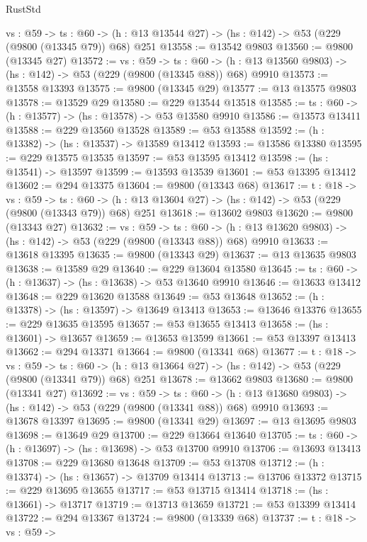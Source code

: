 \begin{lexlean}{RustStd}
\begin{coremodule}
  {vs : @59} ->
  {ts : @60} -> (h : @13 @13544 @27) -> (hs : @142) -> @53 (@229 (@9800 (@13345 @79)) @68) @251
@13558 := @13542 @9803
@13560 := @9800 (@13345 @27)
@13572 := {vs : @59} ->
  {ts : @60} -> (h : @13 @13560 @9803) -> (hs : @142) -> @53 (@229 (@9800 (@13345 @88)) @68) @9910
@13573 := @13558 @13393
@13575 := @9800 (@13345 @29)
@13577 := @13 @13575 @9803
@13578 := @13529 @29
@13580 := @229 @13544 @13518
@13585 := {ts : @60} -> (h : @13577) -> (hs : @13578) -> @53 @13580 @9910
@13586 := @13573 @13411
@13588 := @229 @13560 @13528
@13589 := @53 @13588
@13592 := (h : @13382) -> (hs : @13537) -> @13589 @13412
@13593 := @13586 @13380
@13595 := @229 @13575 @13535
@13597 := @53 @13595 @13412
@13598 := (hs : @13541) -> @13597
@13599 := @13593 @13539
@13601 := @53 @13395 @13412
@13602 := @294 @13375
@13604 := @9800 (@13343 @68)
@13617 := {t : @18} ->
  {vs : @59} ->
  {ts : @60} -> (h : @13 @13604 @27) -> (hs : @142) -> @53 (@229 (@9800 (@13343 @79)) @68) @251
@13618 := @13602 @9803
@13620 := @9800 (@13343 @27)
@13632 := {vs : @59} ->
  {ts : @60} -> (h : @13 @13620 @9803) -> (hs : @142) -> @53 (@229 (@9800 (@13343 @88)) @68) @9910
@13633 := @13618 @13395
@13635 := @9800 (@13343 @29)
@13637 := @13 @13635 @9803
@13638 := @13589 @29
@13640 := @229 @13604 @13580
@13645 := {ts : @60} -> (h : @13637) -> (hs : @13638) -> @53 @13640 @9910
@13646 := @13633 @13412
@13648 := @229 @13620 @13588
@13649 := @53 @13648
@13652 := (h : @13378) -> (hs : @13597) -> @13649 @13413
@13653 := @13646 @13376
@13655 := @229 @13635 @13595
@13657 := @53 @13655 @13413
@13658 := (hs : @13601) -> @13657
@13659 := @13653 @13599
@13661 := @53 @13397 @13413
@13662 := @294 @13371
@13664 := @9800 (@13341 @68)
@13677 := {t : @18} ->
  {vs : @59} ->
  {ts : @60} -> (h : @13 @13664 @27) -> (hs : @142) -> @53 (@229 (@9800 (@13341 @79)) @68) @251
@13678 := @13662 @9803
@13680 := @9800 (@13341 @27)
@13692 := {vs : @59} ->
  {ts : @60} -> (h : @13 @13680 @9803) -> (hs : @142) -> @53 (@229 (@9800 (@13341 @88)) @68) @9910
@13693 := @13678 @13397
@13695 := @9800 (@13341 @29)
@13697 := @13 @13695 @9803
@13698 := @13649 @29
@13700 := @229 @13664 @13640
@13705 := {ts : @60} -> (h : @13697) -> (hs : @13698) -> @53 @13700 @9910
@13706 := @13693 @13413
@13708 := @229 @13680 @13648
@13709 := @53 @13708
@13712 := (h : @13374) -> (hs : @13657) -> @13709 @13414
@13713 := @13706 @13372
@13715 := @229 @13695 @13655
@13717 := @53 @13715 @13414
@13718 := (hs : @13661) -> @13717
@13719 := @13713 @13659
@13721 := @53 @13399 @13414
@13722 := @294 @13367
@13724 := @9800 (@13339 @68)
@13737 := {t : @18} ->
  {vs : @59} ->

\end{coremodule}
\end{lexlean}
